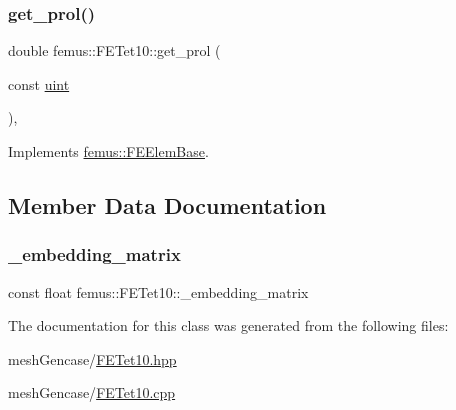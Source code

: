 \mbox{\label{classfemus_1_1_f_e_tet10_a7aa7d792698ab0e0e39bef7575642117}} 
\subsubsection{\texorpdfstring{get\+\_\+prol()}{get\_prol()}}
{\footnotesize\ttfamily double femus\+::\+F\+E\+Tet10\+::get\+\_\+prol (\begin{DoxyParamCaption}\item[{const \mbox{\hyperlink{_typedefs_8hpp_a91ad9478d81a7aaf2593e8d9c3d06a14}{uint}}}]{ }\end{DoxyParamCaption})\hspace{0.3cm}{\ttfamily [inline]}, {\ttfamily [virtual]}}



Implements \mbox{\hyperlink{classfemus_1_1_f_e_elem_base_ac82326cdc7cb02329c7be9547d56fad4}{femus\+::\+F\+E\+Elem\+Base}}.



\subsection{Member Data Documentation}
\mbox{\label{classfemus_1_1_f_e_tet10_a94c06cc33b4084a614e2d7c0a624bc58}} 
\subsubsection{\texorpdfstring{\+\_\+embedding\+\_\+matrix}{\_embedding\_matrix}}
{\footnotesize\ttfamily const float femus\+::\+F\+E\+Tet10\+::\+\_\+embedding\+\_\+matrix\hspace{0.3cm}{\ttfamily [static]}}



The documentation for this class was generated from the following files\+:\begin{DoxyCompactItemize}
\item 
mesh\+Gencase/\mbox{\hyperlink{_f_e_tet10_8hpp}{F\+E\+Tet10.\+hpp}}\item 
mesh\+Gencase/\mbox{\hyperlink{_f_e_tet10_8cpp}{F\+E\+Tet10.\+cpp}}\end{DoxyCompactItemize}

